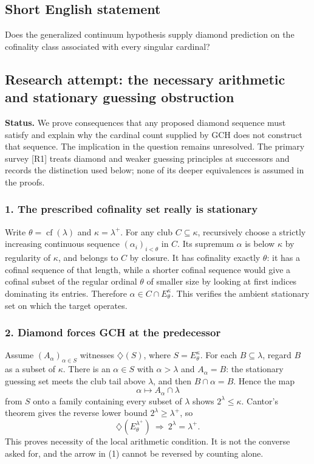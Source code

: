 \documentclass[11pt,a4paper]{article}
\begin{document}
\subsection{Short English statement}

Does the generalized continuum hypothesis supply diamond prediction on the cofinality class associated with every singular cardinal?

\subsection{Research attempt: the necessary arithmetic and stationary guessing obstruction}
\textbf{Status.} We prove consequences that any proposed diamond sequence must satisfy and explain why the cardinal count supplied by GCH does not construct that sequence. The implication in the question remains unresolved. The primary survey [R1] treats diamond and weaker guessing principles at successors and records the distinction used below; none of its deeper equivalences is assumed in the proofs.

\subsubsection{1. The prescribed cofinality set really is stationary}
Write $\theta=\operatorname{cf}(\lambda)$ and $\kappa=\lambda^+$. For any club $C\subseteq\kappa$, recursively choose a strictly increasing continuous sequence $(\alpha_i)_{i<\theta}$ in $C$. Its supremum $\alpha$ is below $\kappa$ by regularity of $\kappa$, and belongs to $C$ by closure. It has cofinality exactly $\theta$: it has a cofinal sequence of that length, while a shorter cofinal sequence would give a cofinal subset of the regular ordinal $\theta$ of smaller size by looking at first indices dominating its entries. Therefore $\alpha\in C\cap E_\theta^\kappa$. This verifies the ambient stationary set on which the target operates.

\subsubsection{2. Diamond forces GCH at the predecessor}
Assume $(A_\alpha)_{\alpha\in S}$ witnesses $\diamondsuit(S)$, where $S=E_\theta^\kappa$. For each $B\subseteq\lambda$, regard $B$ as a subset of $\kappa$. There is an $\alpha\in S$ with $\alpha>\lambda$ and $A_\alpha=B$: the stationary guessing set meets the club tail above $\lambda$, and then $B\cap\alpha=B$. Hence the map
\[\alpha\longmapsto A_\alpha\cap\lambda\]
from $S$ onto a family containing every subset of $\lambda$ shows $2^\lambda\leq\kappa$. Cantor's theorem gives the reverse lower bound $2^\lambda\geq\lambda^+$, so
\[\diamondsuit(E_\theta^{\lambda^+})\ \Longrightarrow\ 2^\lambda=\lambda^+.
\tag{1}\]
This proves necessity of the local arithmetic condition. It is not the converse asked for, and the arrow in (1) cannot be reversed by counting alone.
\end{document}
